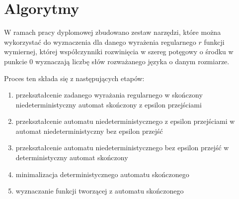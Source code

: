 \chapter{Algorytmy}

W ramach pracy dyplomowej zbudowano zestaw narzędzi, które można wykorzystać do wyznaczenia dla danego wyrażenia regularnego $r$ funkcji wymiernej, której współczynniki rozwinięcia w szereg potęgowy o środku w punkcie $0$ wyznaczają liczbę słów rozważanego języka o danym rozmiarze.

Proces ten składa się z następujących etapów:
\begin{enumerate}
    \item przekształcenie zadanego wyrażania regularnego w skończony niedeterministyczny automat skończony z epsilon przejściami
    \item przekształcenie automatu niedeterministycznego z epsilon przejściami w automat niedeterministyczny bez epsilon przejść
    \item przekształcenie automatu niedeterministycznego bez epsilon przejść w deterministyczny automat skończony
    \item minimalizacja deterministycznego automatu skończonego
    \item wyznaczanie funkcji tworzącej z automatu skończonego
\end{enumerate}

